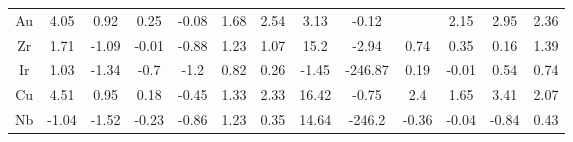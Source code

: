 \begin{center}
\begin{tabular}{| c | c | c | c | c | c | c | c | c | c | c | c | c |}
Au & 4.05 & 0.92 & 0.25 & -0.08 & 1.68 & 2.54 & 3.13 & -0.12 &  & 2.15 & 2.95 & 2.36 \\
Zr & 1.71 & -1.09 & -0.01 & -0.88 & 1.23 & 1.07 & 15.2 & -2.94 & 0.74 & 0.35 & 0.16 & 1.39 \\
Ir & 1.03 & -1.34 & -0.7 & -1.2 & 0.82 & 0.26 & -1.45 & -246.87 & 0.19 & -0.01 & 0.54 & 0.74 \\
Cu & 4.51 & 0.95 & 0.18 & -0.45 & 1.33 & 2.33 & 16.42 & -0.75 & 2.4 & 1.65 & 3.41 & 2.07 \\
Nb & -1.04 & -1.52 & -0.23 & -0.86 & 1.23 & 0.35 & 14.64 & -246.2 & -0.36 & -0.04 & -0.84 & 0.43 \\
\end{tabular}
\end{center}